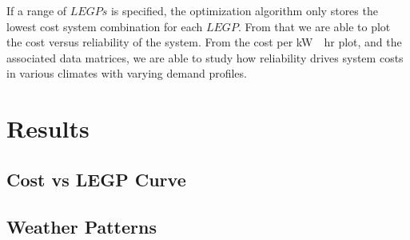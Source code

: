 \documentclass{article}
\begin{document}
If a range of $LEGPs$ is specified, the optimization algorithm only stores the lowest cost system combination for each $LEGP$. From that we are able to plot the cost versus reliability of the system. From the cost per \unit{kW\cdot hr} plot, and the associated data matrices, we are able to study how reliability drives system costs in various climates with varying demand profiles. 


\section{Results}
\subsection{Cost vs LEGP Curve}
\subsection{Weather Patterns}
\end{document}
